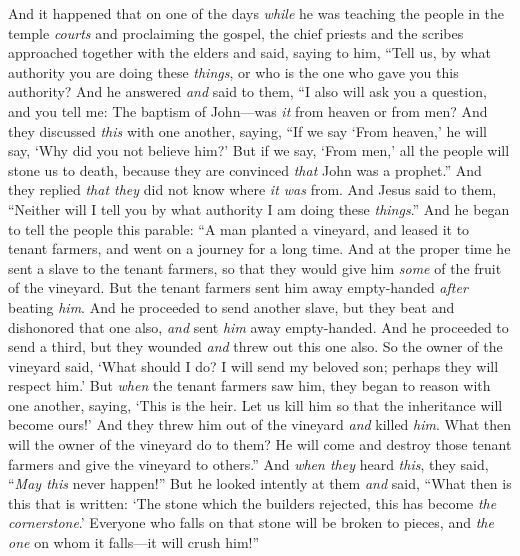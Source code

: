 \begin{biblechapter} %
 And it happened that on one of the days \textit{while} he was teaching the people in the temple \textit{courts} and proclaiming the gospel, the chief priests and the scribes approached together with the elders
\verse and said, saying to him, “Tell us, by what authority you are doing these \textit{things}, or who is the one who gave you this authority?
\verse And he answered \textit{and} said to them, “I also will ask you a question, and you tell me:
\verse The baptism of John—was \textit{it} from heaven or from men?
\verse And they discussed \textit{this} with one another, saying, “If we say ‘From heaven,’ he will say, ‘Why did you not believe him?’
\verse But if we say, ‘From men,’ all the people will stone us to death, because they are convinced \textit{that} John was a prophet.”
\verse And they replied \textit{that they} did not know where \textit{it was} from.
\verse And Jesus said to them, “Neither will I tell you by what authority I am doing these \textit{things}.”
 And he began to tell the people this parable: “A man planted a vineyard, and leased it to tenant farmers, and went on a journey for a long time.
\verse And at the proper time he sent a slave to the tenant farmers, so that they would give him \textit{some} of the fruit of the vineyard. But the tenant farmers sent him away empty-handed \textit{after} beating \textit{him}.
\verse And he proceeded to send another slave, but they beat and dishonored that one also, \textit{and} sent \textit{him} away empty-handed.
\verse And he proceeded to send a third, but they wounded \textit{and} threw out this one also.
\verse So the owner of the vineyard said, ‘What should I do? I will send my beloved son; perhaps they will respect him.’
\verse But \textit{when} the tenant farmers saw him, they began to reason with one another, saying, ‘This is the heir. Let us kill him so that the inheritance will become ours!’
\verse And they threw him out of the vineyard \textit{and} killed \textit{him}. What then will the owner of the vineyard do to them?
\verse He will come and destroy those tenant farmers and give the vineyard to others.” And \textit{when they} heard \textit{this}, they said, “\textit{May this} never happen!”
\verse But he looked intently at them \textit{and} said, “What then is this that is written: ‘The stone which the builders rejected, 
this has become \textit{the cornerstone}.’
\verse Everyone who falls on that stone will be broken to pieces, and \textit{the one} on whom it falls—it will crush him!”

\end{biblechapter}
